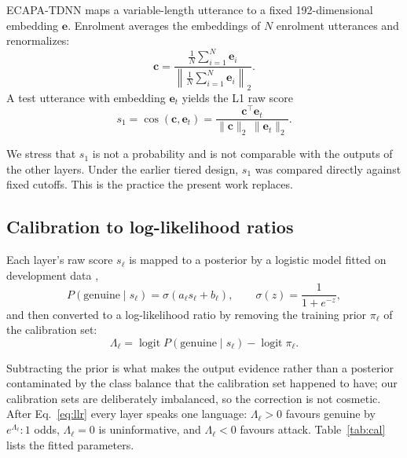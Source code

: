 \documentclass[conference]{IEEEtran}
\begin{document}
ECAPA-TDNN maps a variable-length utterance to a fixed 192-dimensional
embedding $\mathbf{e}$. Enrolment averages the embeddings of $N$ enrolment
utterances and renormalizes:
\begin{equation}
\mathbf{c} = \frac{\frac{1}{N}\sum_{i=1}^{N}\mathbf{e}_i}
{\left\lVert \frac{1}{N}\sum_{i=1}^{N}\mathbf{e}_i \right\rVert_2}.
\end{equation}
A test utterance with embedding $\mathbf{e}_t$ yields the L1 raw score
\begin{equation}
s_1 = \cos(\mathbf{c},\mathbf{e}_t)
    = \frac{\mathbf{c}^{\top}\mathbf{e}_t}
      {\lVert\mathbf{c}\rVert_2\,\lVert\mathbf{e}_t\rVert_2}.
\end{equation}

We stress that $s_1$ is not a probability and is not comparable with the
outputs of the other layers. Under the earlier tiered design, $s_1$ was
compared directly against fixed cutoffs. This is the practice the present work
replaces.

\subsection{Calibration to log-likelihood ratios}
\label{sec:calibration}

Each layer's raw score $s_\ell$ is mapped to a posterior by a logistic model
fitted on development data \cite{platt1999probabilistic},
\begin{equation}
P(\text{genuine}\mid s_\ell)=\sigma(a_\ell s_\ell + b_\ell),\qquad
\sigma(z)=\frac{1}{1+e^{-z}},
\end{equation}
and then converted to a log-likelihood ratio by removing the training prior
$\pi_\ell$ of the calibration set:
\begin{equation}
\label{eq:llr}
\Lambda_\ell = \operatorname{logit}P(\text{genuine}\mid s_\ell)
             - \operatorname{logit}\pi_\ell .
\end{equation}

Subtracting the prior is what makes the output evidence rather than a
posterior contaminated by the class balance that the calibration set happened
to have; our calibration sets are deliberately imbalanced, so the correction is
not cosmetic. After Eq.~\eqref{eq:llr} every layer speaks one language:
$\Lambda_\ell>0$ favours genuine by $e^{\Lambda_\ell}\!:\!1$ odds,
$\Lambda_\ell=0$ is uninformative, and $\Lambda_\ell<0$ favours attack.
Table~\ref{tab:cal} lists the fitted parameters.
\end{document}
